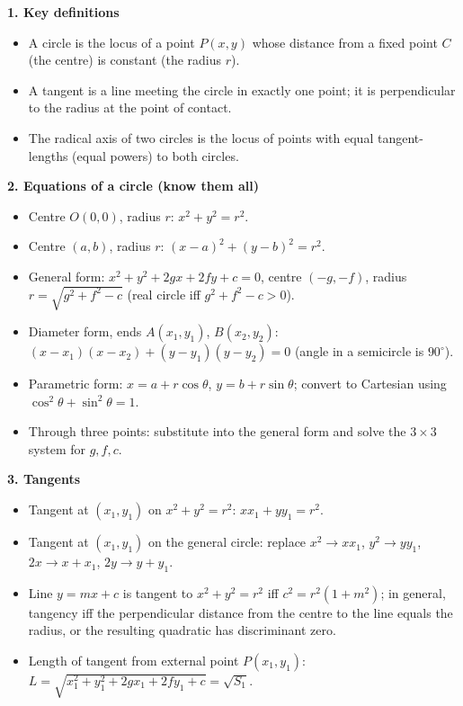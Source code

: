 \documentclass[11pt]{article}
\newcommand{\cle}[1]{{\popxbold\color{popdark}#1}}
\begin{document}
\begin{bilan}

\textbf{1. Key definitions}
\begin{itemize}
\item A \cle{circle} is the locus of a point $P(x,y)$ whose distance from a fixed point $C$ (the \cle{centre}) is constant (the \cle{radius} $r$).
\item A \cle{tangent} is a line meeting the circle in exactly one point; it is perpendicular to the radius at the point of contact.
\item The \cle{radical axis} of two circles is the locus of points with equal tangent-lengths (equal powers) to both circles.
\end{itemize}

\textbf{2. Equations of a circle (know them all)}
\begin{itemize}
\item Centre $O(0,0)$, radius $r$: \; $x^2+y^2=r^2$.
\item Centre $(a,b)$, radius $r$: \; $(x-a)^2+(y-b)^2=r^2$.
\item General form: $x^2+y^2+2gx+2fy+c=0$, centre $(-g,-f)$, radius $r=\sqrt{g^2+f^2-c}$ (real circle iff $g^2+f^2-c>0$).
\item Diameter form, ends $A(x_1,y_1)$, $B(x_2,y_2)$: $(x-x_1)(x-x_2)+(y-y_1)(y-y_2)=0$ (angle in a semicircle is $90^\circ$).
\item Parametric form: $x=a+r\cos\theta$, $y=b+r\sin\theta$; convert to Cartesian using $\cos^2\theta+\sin^2\theta=1$.
\item Through three points: substitute into the general form and solve the $3\times 3$ system for $g,f,c$.
\end{itemize}

\textbf{3. Tangents}
\begin{itemize}
\item Tangent at $(x_1,y_1)$ on $x^2+y^2=r^2$: \; $xx_1+yy_1=r^2$.
\item Tangent at $(x_1,y_1)$ on the general circle: replace $x^2\to xx_1$, $y^2\to yy_1$, $2x\to x+x_1$, $2y\to y+y_1$.
\item Line $y=mx+c$ is tangent to $x^2+y^2=r^2$ iff $c^2=r^2(1+m^2)$; in general, tangency iff the \cle{perpendicular distance} from the centre to the line equals the radius, or the resulting quadratic has discriminant zero.
\item Length of tangent from external point $P(x_1,y_1)$: $L=\sqrt{x_1^2+y_1^2+2gx_1+2fy_1+c}=\sqrt{S_1}$.
\end{itemize}


\end{bilan}
\end{document}
